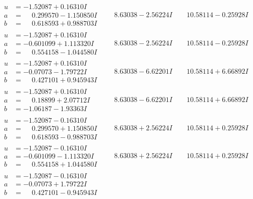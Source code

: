 \documentclass[1p]{elsarticle_modified}
\theoremstyle{definition}
\begin{document}
$$\begin{array}{c|c|c}
\begin{aligned}
u &= -1.52087 + 0.16310 I \\
a &= \phantom{-}0.299570 - 1.150850 I \\
b &= \phantom{-}0.618593 + 0.988703 I\end{aligned}
 & \phantom{-}8.63038 - 2.56224 I & \phantom{-}10.58114 - 0.25928 I \\ \hline\begin{aligned}
u &= -1.52087 + 0.16310 I \\
a &= -0.601099 + 1.113320 I \\
b &= \phantom{-}0.554158 - 1.044580 I\end{aligned}
 & \phantom{-}8.63038 - 2.56224 I & \phantom{-}10.58114 - 0.25928 I \\ \hline\begin{aligned}
u &= -1.52087 + 0.16310 I \\
a &= -0.07073 - 1.79722 I \\
b &= \phantom{-}0.427101 + 0.945943 I\end{aligned}
 & \phantom{-}8.63038 - 6.62201 I & \phantom{-}10.58114 + 6.66892 I \\ \hline\begin{aligned}
u &= -1.52087 + 0.16310 I \\
a &= \phantom{-}0.18899 + 2.07712 I \\
b &= -1.06187 - 1.93363 I\end{aligned}
 & \phantom{-}8.63038 - 6.62201 I & \phantom{-}10.58114 + 6.66892 I \\ \hline\begin{aligned}
u &= -1.52087 - 0.16310 I \\
a &= \phantom{-}0.299570 + 1.150850 I \\
b &= \phantom{-}0.618593 - 0.988703 I\end{aligned}
 & \phantom{-}8.63038 + 2.56224 I & \phantom{-}10.58114 + 0.25928 I \\ \hline\begin{aligned}
u &= -1.52087 - 0.16310 I \\
a &= -0.601099 - 1.113320 I \\
b &= \phantom{-}0.554158 + 1.044580 I\end{aligned}
 & \phantom{-}8.63038 + 2.56224 I & \phantom{-}10.58114 + 0.25928 I \\ \hline\begin{aligned}
u &= -1.52087 - 0.16310 I \\
a &= -0.07073 + 1.79722 I \\
b &= \phantom{-}0.427101 - 0.945943 I\end{aligned}

\end{array}$$
\end{document}
